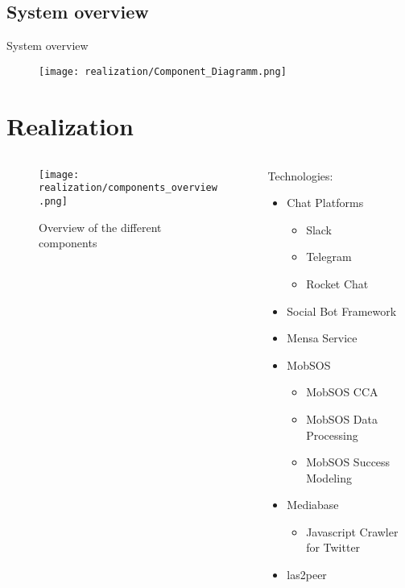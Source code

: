 \subsection{System overview}

\begin{frame}{System overview}
  \begin{figure}
    \centering
    \texttt{[image: realization/Component\_Diagramm.png]}

    \label{fig:sytsemOverview}
  \end{figure}
\end{frame}

\section{Realization}

\begin{frame}\begin{columns}
    \begin{column}[]{0.7\textwidth}
      \begin{figure}
        \centering
        \texttt{[image: realization/components\_overview.png]}
        \caption{Overview of the different components}
        \label{fig:componentsOverview}
      \end{figure}
    \end{column}
    \begin{column}[]{0.3\textwidth}
      Technologies:
      \begin{itemize}
        \item Chat Platforms
              \begin{itemize}
                \item Slack
                \item Telegram
                \item Rocket Chat
              \end{itemize}
        \item Social Bot Framework
        \item Mensa Service

        \item MobSOS
              \begin{itemize}
                \item MobSOS CCA
                \item MobSOS Data Processing
                \item MobSOS Success Modeling
              \end{itemize}
        \item Mediabase
              \begin{itemize}
                \item Javascript Crawler for Twitter
              \end{itemize}
        \item las2peer
      \end{itemize}
    \end{column}
  \end{columns}

\end{frame}

